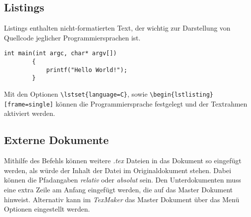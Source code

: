 \documentclass[10pt]{article}  %
\begin{document}
    \subsection{Listings}
    Listings enthalten nicht-formatierten Text, der wichtig zur Darstellung von Quellcode jeglicher Programmiersprachen ist.
    \lstset{language=C}
    \begin{lstlisting}[frame=single]
        int main(int argc, char* argv[]) 
        {
            printf("Hello World!");
        }
    \end{lstlisting}
    Mit den Optionen \verb!\lstset{language=C}!, sowie \verb!\begin{lstlisting}[frame=single]! können die Programmiersprache festgelegt und der Textrahmen aktiviert werden.

    \subsection{Externe Dokumente}
    Mithilfe des \verb!! Befehls können weitere \emph{.tex} Dateien in das Dokument so eingefügt werden, als würde der Inhalt der Datei im Originaldokument stehen.
    Dabei können die Pfadangaben \emph{relativ} oder \emph{absolut} sein. Den Unterdokumenten muss eine extra Zeile am Anfang eingefügt werden, die auf das Master Dokument hinweist. Alternativ kann im \emph{TexMaker}
    das Master Dokument über das Menü Optionen eingestellt werden.
\end{document}
